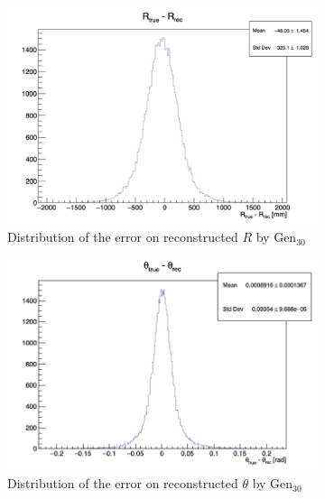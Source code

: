 \documentclass[../main.tex]{subfiles}
\begin{document}
{{\begin{figure}[ht]
  \begin{subfigure}[t]{0.32\linewidth}
    \centering
    \includegraphics[width=\linewidth]{images/jcnn/vic_cnn/cnn_delta_r.png}
    \caption{Distribution of the error on reconstructed $R$ by $\mathrm{Gen}_{30}$}
    \label{fig:jcnn:vic_cnn:cnn_delta_r}
  \end{subfigure}
  \begin{subfigure}[t]{0.32\linewidth}
    \centering
    \includegraphics[width=\linewidth]{images/jcnn/vic_cnn/cnn_delta_theta.png}
    \caption{Distribution of the error on reconstructed $\theta$ by $\mathrm{Gen}_{30}$}
    \label{fig:jcnn:vic_cnn:cnn_delta_theta}
  \end{subfigure}
  \begin{subfigure}[t]{0.32\linewidth}
    \centering

\end{subfigure}
\end{figure}}}
\end{document}
